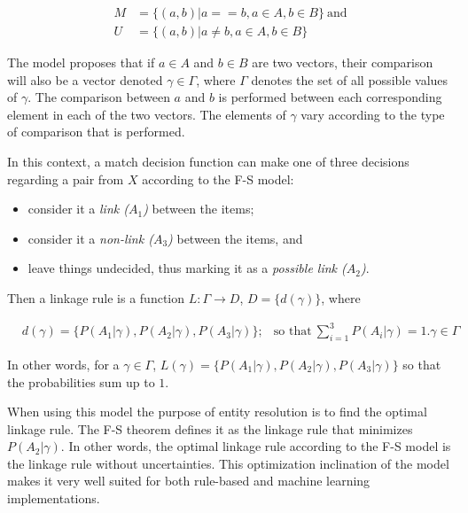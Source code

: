 \documentclass[11pt]{article}
\begin{document}
    \begin{align}
        M &= \{(a, b) | a == b, a \in A, b \in B\}~\textrm{and} \\
        U &= \{(a, b) | a \neq b, a \in A, b \in B\}
    \end{align}

    The model proposes that if $a \in A$ and $b \in B$ are two vectors, their
    comparison will also be a vector denoted $\gamma \in \varGamma$, where
    $\varGamma$ denotes the set of all possible values of $\gamma$.
    The comparison between $a$ and $b$ is performed between each corresponding
    element in each of the two vectors.
    The elements of $\gamma$ vary according to the type of comparison that is
    performed\cite{winkler1990}.

    In this context, a match decision function can make one of three decisions
    regarding a pair from $X$ according to the F-S model:
    
    \begin{itemize}
        \item consider it a \textit{link ($A_1$)} between the items;
        \item consider it a \textit{non-link ($A_3$)} between the items, and
        \item leave things undecided, thus marking it as a \textit{possible link
              ($A_2$)}.
    \end{itemize}
    
    Then a linkage rule is a function $L:\varGamma \rightarrow D$,
    $D=\{d(\gamma)\}$, where
    
    \begin{align}
        &d(\gamma) = \{P(A_1|\gamma),P(A_2|\gamma),P(A_3|\gamma)\};
        &\textrm{so that}~\sum_{i=1}^{3}P(A_i|\gamma) = 1\nonumber.
        \gamma \in \varGamma\nonumber
    \end{align}

    In other words, for a $\gamma \in \varGamma$, $L(\gamma) = \{P(A_1|\gamma),
    P(A_2|\gamma), P(A_3|\gamma)\}$ so that the probabilities sum up to $1$.

    When using this model the purpose of entity resolution is to find the
    optimal linkage rule.
    The F-S theorem defines it as the linkage rule that minimizes
    $P(A_2|\gamma)$.
    In other words, the optimal linkage rule according to the F-S model is the
    linkage rule without uncertainties.
    This optimization inclination of the model makes it very well suited for
    both rule-based\cite{oyster2012} and machine learning\cite{deepm2020}
    implementations.
    
\end{document}
